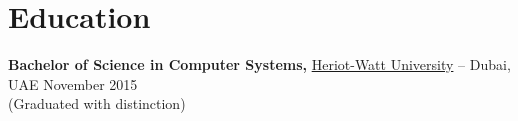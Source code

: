 \documentclass[10pt,letterpaper]{article}
\begin{document}
\vspace{-7pt}

\vspace{-9.5pt}
\section*{Education}
\textbf{Bachelor of Science in Computer Systems,} \href{https://www.hw.ac.uk/dubai}{Heriot-Watt University} -- Dubai, UAE \hfill November 2015 \\
(Graduated with distinction)

\end{document}
